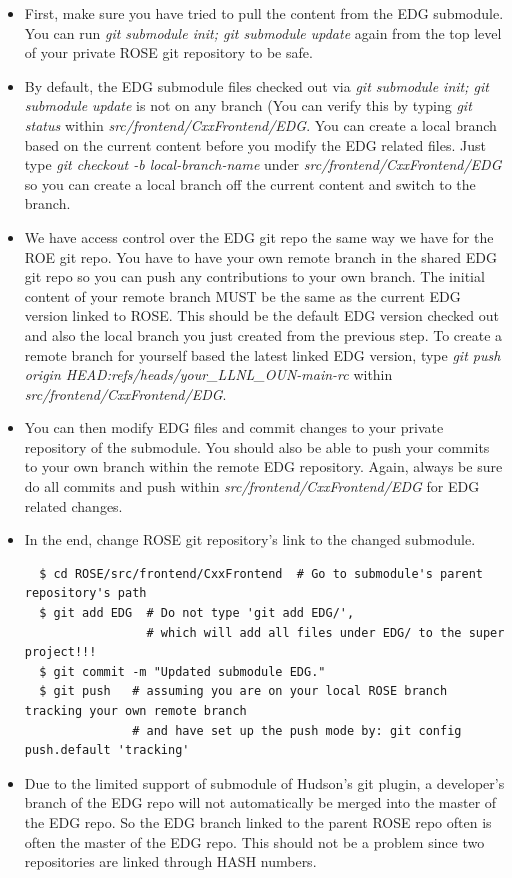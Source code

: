 \begin{itemize}
\begin{itemize}
  \item First, make sure you have tried to pull the content from the EDG submodule. You can run \textit{git submodule init; git submodule update} again from the top level of your private ROSE git repository to be safe. 
  \item By default, the EDG submodule files checked out via \textit{git submodule init; git submodule update} is not on any branch (You can verify this by typing \textit{git status} within \textit{src/frontend/CxxFrontend/EDG}.  
You can create a local branch based on the current content before you modify the EDG related files. Just type \textit{git checkout -b local-branch-name} under \textit{src/frontend/CxxFrontend/EDG} so you can create a local branch off the current content and switch to the branch.
   \item We have access control over the EDG git repo the same way we have
   for the ROE git repo. You have to have your own remote branch in
   the shared EDG git repo so you can push any contributions to your own
   branch. The initial content of your remote branch
   MUST be the same as the current EDG version linked to ROSE. This
   should be the default EDG version checked out and also the local branch
   you just created from the previous step. To create a remote branch for
   yourself based the latest linked EDG version, type 
   \textit{git push origin HEAD:refs/heads/your\_LLNL\_OUN-main-rc} within \textit{src/frontend/CxxFrontend/EDG}.
   \item You can then modify EDG files and commit changes to your private repository of the submodule. 
         You should also be able to push your commits to your own branch
         within the remote EDG repository.
         Again, always be sure do all commits and push within \textit{src/frontend/CxxFrontend/EDG} for EDG related changes. 
   \item In the end, change ROSE git repository's link to the changed submodule. 
  \begin{verbatim}
  $ cd ROSE/src/frontend/CxxFrontend  # Go to submodule's parent repository's path 
  $ git add EDG  # Do not type 'git add EDG/', 
                 # which will add all files under EDG/ to the super project!!!
  $ git commit -m "Updated submodule EDG."
  $ git push   # assuming you are on your local ROSE branch tracking your own remote branch 
               # and have set up the push mode by: git config push.default 'tracking'
  \end{verbatim}  
  \item Due to the limited support of submodule of Hudson's git plugin, a developer's branch
  of the EDG repo will not automatically be merged into the master of the EDG repo. So
  the EDG branch linked to the parent ROSE repo often is often the master of
  the EDG repo. This should not be a problem since two repositories are
  linked through HASH numbers. 
   

\end{itemize}
\end{itemize}
